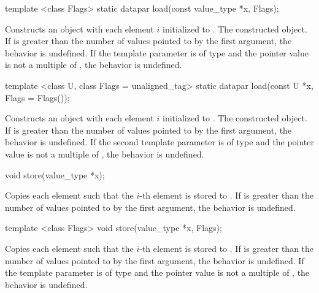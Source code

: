 \begin{wgText}
  \begin{itemdecl}
template <class Flags> static datapar load(const value_type *x, Flags);
  \end{itemdecl}
  \begin{itemdescr}
    \pnum\effects Constructs an object with each element $i$ initialized to .
    \pnum\returns The constructed object.
    \pnum\remarks If \datapar{} is greater than the number of values pointed to by the first argument, the behavior is undefined.
    \pnum\remarks If the template parameter is of type  and the pointer value is not a multiple of , the behavior is undefined.
  \end{itemdescr}

  \begin{itemdecl}
template <class U, class Flags = unaligned_tag> static datapar load(const U *x, Flags = Flags());
  \end{itemdecl}
  \begin{itemdescr}
    \pnum\effects Constructs an object with each element $i$ initialized to .
    \pnum\returns The constructed object.
    \pnum\remarks If \datapar{} is greater than the number of values pointed to by the first argument, the behavior is undefined.
    \pnum\remarks If the second template parameter is of type  and the pointer value is not a multiple of , the behavior is undefined.
  \end{itemdescr}

  \begin{itemdecl}
void store(value_type *x);
  \end{itemdecl}
  \begin{itemdescr}
    \pnum\effects Copies each element such that the $i$-th element is stored to .
    \pnum\remarks If \datapar{} is greater than the number of values pointed to by the first argument, the behavior is undefined.
  \end{itemdescr}

  \begin{itemdecl}
template <class Flags> void store(value_type *x, Flags);
  \end{itemdecl}
  \begin{itemdescr}
    \pnum\effects Copies each element such that the $i$-th element is stored to .
    \pnum\remarks If \datapar{} is greater than the number of values pointed to by the first argument, the behavior is undefined.
    \pnum\remarks If the template parameter is of type  and the pointer value is not a multiple of , the behavior is undefined.
  \end{itemdescr}


\end{wgText}
